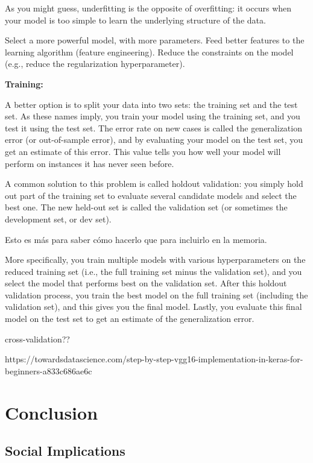 \documentclass[12pt, a4paper]{article}
\begin{document}
	 As you might guess, underfitting is the opposite of overfitting: it occurs when your model is too simple to learn the underlying structure of the data.
	 
	 Select a more powerful model, with more parameters.
	 Feed better features to the learning algorithm (feature engineering).
	 Reduce the constraints on the model (e.g., reduce the regularization hyperparameter).
	 
	 \textbf{Training:}
	 
	 A better option is to split your data into two sets: the training set and the test set. As these names imply, you train your model using the training set, and you test it using the test set. The error rate on new cases is called the generalization error (or out-of-sample error), and by evaluating your model on the test set, you get an estimate of this error. This value tells you how well your model will perform on instances it has never seen before.
	 
	 A common solution to this problem is called holdout validation: you simply hold out part of the training set to evaluate several candidate models and select the best one. The new held-out set is called the validation set (or sometimes the development set, or dev set).
	 
	 	Esto es más para saber cómo hacerlo que para incluirlo en la memoria.
	 	
	 More specifically, you train multiple models with various hyperparameters on the reduced training set (i.e., the full training set minus the validation set), and you select the model that performs best on the validation set. After this holdout validation process, you train the best model on the full training set (including the validation set), and this gives you the final model. Lastly, you evaluate this final model on the test set to get an estimate of the generalization error.
	
	cross-validation?? 
	
	https://towardsdatascience.com/step-by-step-vgg16-implementation-in-keras-for-beginners-a833c686ae6c
	
	\clearpage
	
	\section{Conclusion}
	
	\clearpage
	
	\subsection{Social Implications}
	
\end{document}
